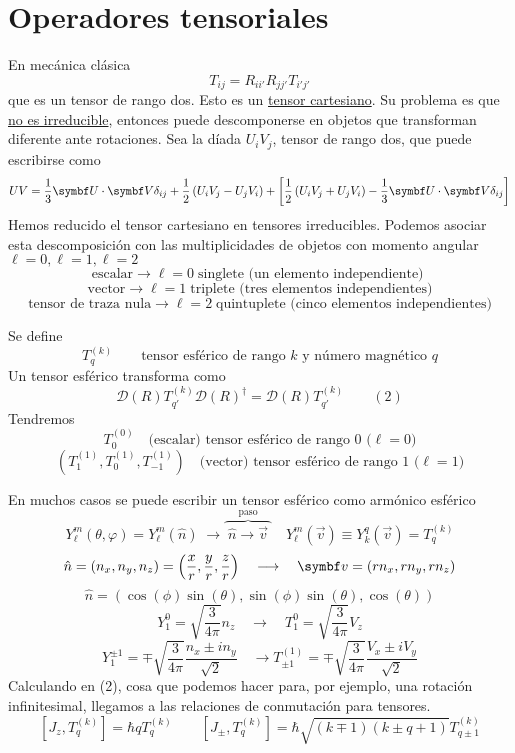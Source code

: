\documentclass[10pt,oneside]{CBFT_book}
\begin{document}
\section{Operadores tensoriales}

En mecánica clásica 
\[
	T_{ij} = R_{ii'} R_{jj'} T_{i' j'}
\]
que es un tensor de rango dos. Esto es un \underline{tensor cartesiano}. Su problema es que \underline{no es 
irreducible}, entonces puede descomponerse en objetos que transforman diferente ante rotaciones. Sea la díada 
$U_iV_j$, tensor de rango dos, que puede escribirse como 
\[
	UV = \frac{1}{3}\vb{U}\cdot\vb{V}\delta_{ij} + \frac{1}{2}\left( U_iV_j - U_jV_i \right) +
	\left[ \frac{1}{2}\left( U_iV_j + U_jV_i \right) - \frac{1}{3}\vb{U}\cdot\vb{V}\delta_{ij}\right]
\]
Hemos reducido el tensor cartesiano en tensores irreducibles. Podemos asociar esta descomposición con las 
multiplicidades de objetos con momento angular $\ell=0, \ell=1, \ell=2$
\[
	\text{escalar} \longrightarrow \ell=0 \; \text{singlete (un elemento independiente) }
\]
\[
	\text{vector} \longrightarrow \ell=1 \; \text{triplete (tres elementos independientes)}
\]
\[
	\text{tensor de traza nula} \longrightarrow \ell=2 \; \text{quintuplete (cinco elementos 
independientes)}
\]

Se define 
\[
	T^{(k)}_q \qquad \text{tensor esférico de rango $k$ y número magnético $q$}
\]
Un tensor esférico transforma como 
\[
	\mathcal{D}(R) T_{q'}^{(k)} \mathcal{D}(R)^\dagger = \mathcal{D}(R) T_{q'}^{(k)}  \qquad (2)
\]
Tendremos 
\[
	T^{(0)}_0 \quad \text{(escalar) tensor esférico de rango 0 ($\ell=0$)}
\]
\[
	(T^{(1)}_1,T^{(1)}_0,T^{(1)}_{-1}) \quad \text{(vector) tensor esférico de rango 1 ($\ell=1$)}
\]

En muchos casos se puede escribir un tensor esférico como armónico esférico 
\[
	Y_\ell^{m}(\theta,\varphi) = Y_\ell^{m}(\hat{n}) \; \longrightarrow 
	\overbrace{ \phantom{.}\hat{n} \longrightarrow \vec{v}\phantom{.}}^{\text{paso}} \quad
	Y_\ell^m(\vec{v}) \equiv Y_k^q(\vec{v}) = T_q^{(k)}
\]
\[
	\hat{n} = (n_x,n_y,n_z) = \left( \frac{x}{r}, \frac{y}{r}, \frac{z}{r} \right) \quad 
	\longrightarrow \quad \vb{v} = (rn_x,rn_y,rn_z)
\]
\[
	\hat{n} = ( \cos(\phi)\sin(\theta), \sin(\phi)\sin(\theta), \cos(\theta))
\]
\[
	Y_1^0 = \sqrt{\frac{3}{4\pi}}n_z \quad \longrightarrow \quad T_1^0 = \sqrt{\frac{3}{4\pi}}V_z
\]
\[
	Y_1^{\pm 1} = \mp \sqrt{\frac{3}{4\pi}} \frac{n_x \pm i n_y}{\sqrt{2}} \quad \longrightarrow
	T_{\pm 1}^{(1)} = \mp \sqrt{\frac{3}{4\pi}} \frac{V_x \pm i V_y}{\sqrt{2}}
\]
Calculando en (2), cosa que podemos hacer para, por ejemplo, una rotación infinitesimal, llegamos a las 
relaciones de conmutación para tensores.
\[
	[ J_z, T_q^{(k)} ] = \hbar q T_q^{(k)} \qquad 
	[J_{\pm},T_q^{(k)}] = \hbar \sqrt{(k\mp 1)(k\pm q + 1)} T_{q\pm 1}^{(k)}
\]


\end{document}
